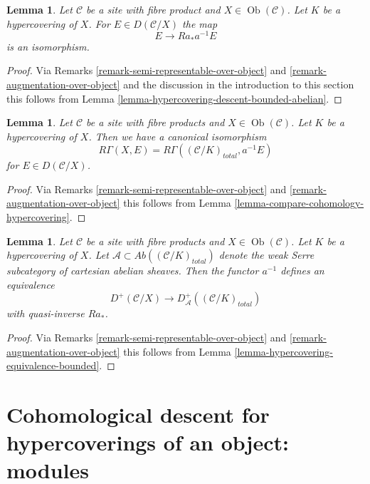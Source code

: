 \documentclass{stacks-project}
\theoremstyle{plain}
\newtheorem{lemma}[subsection]{Lemma}
\theoremstyle{definition}
\theoremstyle{remark}
\numberwithin{equation}{subsection}
\def\Ob{\mathop{\mathrm{Ob}}\nolimits}
\begin{document}
\begin{lemma}
\label{lemma-hypercovering-X-descent-bounded-abelian}
Let $\mathcal{C}$ be a site with fibre product and $X \in \Ob(\mathcal{C})$.
Let $K$ be a hypercovering of $X$. For
$E \in D(\mathcal{C}/X)$ the map
$$
E \longrightarrow Ra_*a^{-1}E
$$
is an isomorphism.
\end{lemma}

\begin{proof}
Via Remarks \ref{remark-semi-representable-over-object} and
\ref{remark-augmentation-over-object} and the discussion in
the introduction to this section
this follows from Lemma \ref{lemma-hypercovering-descent-bounded-abelian}.
\end{proof}

\begin{lemma}
\label{lemma-compare-cohomology-hypercovering-X}
Let $\mathcal{C}$ be a site with fibre products and $X \in \Ob(\mathcal{C})$.
Let $K$ be a hypercovering of $X$.
Then we have a canonical isomorphism
$$
R\Gamma(X, E) = R\Gamma((\mathcal{C}/K)_{total}, a^{-1}E)
$$
for $E \in D(\mathcal{C}/X)$.
\end{lemma}

\begin{proof}
Via Remarks \ref{remark-semi-representable-over-object} and
\ref{remark-augmentation-over-object}
this follows from Lemma \ref{lemma-compare-cohomology-hypercovering}.
\end{proof}

\begin{lemma}
\label{lemma-hypercovering-X-equivalence-bounded}
Let $\mathcal{C}$ be a site with fibre products and $X \in \Ob(\mathcal{C})$.
Let $K$ be a hypercovering of $X$.
Let $\mathcal{A} \subset \textit{Ab}((\mathcal{C}/K)_{total})$
denote the weak Serre subcategory of cartesian abelian sheaves.
Then the functor $a^{-1}$ defines an equivalence
$$
D^+(\mathcal{C}/X) \longrightarrow D_\mathcal{A}^+((\mathcal{C}/K)_{total})
$$
with quasi-inverse $Ra_*$.
\end{lemma}

\begin{proof}
Via Remarks \ref{remark-semi-representable-over-object} and
\ref{remark-augmentation-over-object}
this follows from Lemma \ref{lemma-hypercovering-equivalence-bounded}.
\end{proof}








\section{Cohomological descent for hypercoverings of an object: modules}
\label{section-cohomological-descent-hypercoverings-X-modules}
\end{document}
